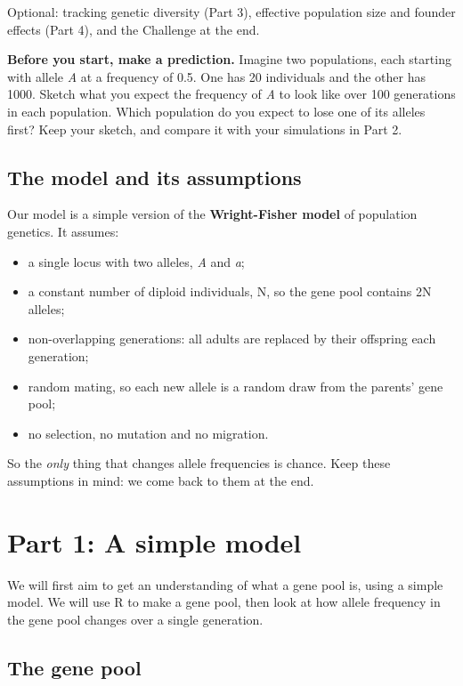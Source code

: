 \documentclass[
  a4paper]{book}
\providecommand{\tightlist}{%
  \setlength{\itemsep}{0pt}\setlength{\parskip}{0pt}}
\begin{document}
Optional: tracking genetic diversity (Part 3), effective population size and founder effects (Part 4), and the Challenge at the end.

\textbf{Before you start, make a prediction.} Imagine two populations, each starting with allele \emph{A} at a frequency of 0.5. One has 20 individuals and the other has 1000. Sketch what you expect the frequency of \emph{A} to look like over 100 generations in each population. Which population do you expect to lose one of its alleles first? Keep your sketch, and compare it with your simulations in Part 2.

\subsection{The model and its assumptions}\label{the-model-and-its-assumptions}

Our model is a simple version of the \textbf{Wright-Fisher model} of population genetics. It assumes:

\begin{itemize}
\tightlist
\item
  a single locus with two alleles, \emph{A} and \emph{a};
\item
  a constant number of diploid individuals, N, so the gene pool contains 2N alleles;
\item
  non-overlapping generations: all adults are replaced by their offspring each generation;
\item
  random mating, so each new allele is a random draw from the parents' gene pool;
\item
  no selection, no mutation and no migration.
\end{itemize}

So the \emph{only} thing that changes allele frequencies is chance. Keep these assumptions in mind: we come back to them at the end.

\section{Part 1: A simple model}\label{part-1-a-simple-model}

We will first aim to get an understanding of what a gene pool is, using a simple model. We will use R to make a gene pool, then look at how allele frequency in the gene pool changes over a single generation.

\subsection{The gene pool}\label{the-gene-pool}
\end{document}
